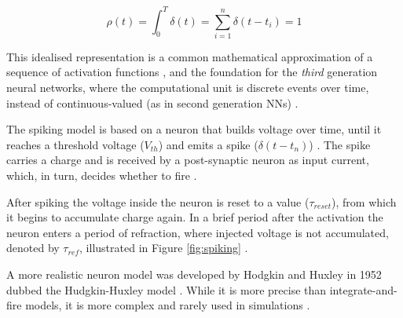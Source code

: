 \documentclass[report.tex]{subfiles}
\begin{document}
\begin{equation} \label{eq:dirac}
  \rho(t) = \int_0^T \delta(t) = \sum_{i=1}^n \delta(t - t_i) = 1
\end{equation}

This idealised representation is a common mathematical approximation of
a sequence of activation functions \cite{Dayan2001, Eliasmith2004},
and the foundation for the \textit{third} generation
neural networks, where the computational unit is discrete events over time,
instead of continuous-valued (as in second generation \glspl{NN})
\cite{Maass1997}.

The spiking model is based on a neuron that builds voltage over time, until
it reaches a threshold voltage ($V_{th}$) and emits a spike
\mbox{($\delta(t-t_n)$)}
\cite{Dayan2001, Eliasmith2004}.
The spike carries a charge and is received by a post-synaptic neuron as
input current, which, in turn, decides whether to fire \cite{Dayan2001}.

After spiking the voltage inside the neuron is reset to a value ($\tau_{reset}$),
from which it begins to accumulate charge again.
In a brief period after the activation the neuron enters a period of
refraction, 
where injected voltage is not accumulated, denoted by 
$\tau_{ref}$, illustrated in Figure \ref{fig:spiking}
\cite[p. 82]{Eliasmith2004}.

A more realistic neuron model was developed by Hodgkin
and Huxley in 1952 dubbed the Hudgkin-Huxley model \cite{Dayan2001}.
While it is more precise than integrate-and-fire models, it is
more complex \cite[p. 195]{Dayan2001} and rarely used in simulations
\cite{Albada2018, Dayan2001, Eliasmith2015}.
\end{document}
